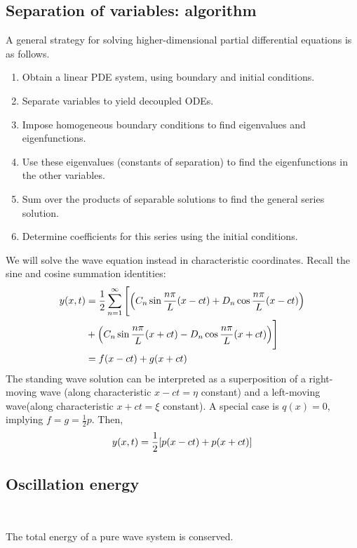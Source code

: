 \documentclass[a4paper]{article}
\begin{document}
\subsection{Separation of variables: algorithm}
A general strategy for solving higher-dimensional partial differential equations is as follows.
\begin{enumerate}
	\item Obtain a linear PDE system, using boundary and initial conditions.
	\item Separate variables to yield decoupled ODEs.
	\item Impose homogeneous boundary conditions to find eigenvalues and eigenfunctions.
	\item Use these eigenvalues (constants of separation) to find the eigenfunctions in the other variables.
	\item Sum over the products of separable solutions to find the general series solution.
	\item Determine coefficients for this series using the initial conditions.
\end{enumerate}
\begin{example}
	We will solve the wave equation instead in characteristic coordinates.
	Recall the sine and cosine summation identities:
	\begin{align*}
		y(x,t) & = \frac{1}{2} \sum_{n=1}^\infty \Bigg[ \qty(C_n \sin \frac{n \pi}{L}(x-ct) + D_n \cos \frac{n \pi}{L}(x-ct)) \\&
		+ \qty(C_n \sin \frac{n \pi}{L}(x+ct) - D_n \cos \frac{n \pi}{L}(x+ct)) \Bigg]                                        \\
		       & = f(x-ct) + g(x+ct)
	\end{align*}
	The standing wave solution can be interpreted as a superposition of a right-moving wave (along characteristic $ x-ct=\eta $ constant) and a left-moving wave(along characteristic $ x+ct=\xi $ constant).
	A special case is \( q(x) = 0 \), implying \( f = g = \frac{1}{2} p \).
	Then,
	\[
		y(x,t) = \frac{1}{2}\qty[p(x-ct) + p(x+ct)]
	\]
\end{example}

\subsection{Oscillation energy}\ \vspace{-1.5em}

\begin{proposition}
    The total energy of a pure wave system is conserved.
\end{proposition}
\end{document}

